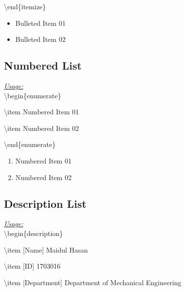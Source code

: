 \documentclass[12pt, twocolumn]{article}
\begin{document}
 \textbackslash end\{itemize\}

 \begin{center} \big\Downarrow \end{center}
 
 \begin{itemize}
  \item Bulleted Item 01
  \item Bulleted Item 02  
 \end{itemize}

 \subsection{Numbered List}
 
 \underline{\textit{Usage:}} \\
 
 \textbackslash begin\{enumerate\}
 
 \hspace*{6mm} \textbackslash item Numbered Item 01
 
 \hspace*{6mm} \textbackslash item Numbered Item 02
 
 \textbackslash end\{enumerate\}

 \begin{center} \big\Downarrow \end{center} 
 
 \begin{enumerate}
  \item Numbered Item 01
  \item Numbered Item 02
 \end{enumerate}

 \subsection{Description List}
  
 \underline{\textit{Usage:}} \\
 
 \textbackslash begin\{description\}
 
  \hspace*{6mm} \textbackslash item [Name] Maidul Hasan
  
  \hspace*{6mm} \textbackslash item [ID] 1703016
  
  \hspace*{6mm} \textbackslash item [Department] Department of Mechanical Engineering
  
\end{document}
